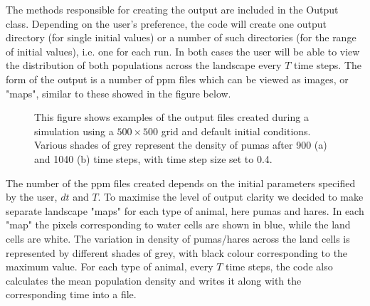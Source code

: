       The methods responsible for creating the output are included in the Output class. Depending on the user's preference, the code will create one output directory (for single initial values) or a number of such directories (for the range of initial values), i.e. one for each run. In both cases the user will be able to view the distribution of both populations across the landscape every $T$ time steps. The form of the output is a number of ppm files which can be viewed as images, or "maps", similar to these showed in the figure below.
     
      
      \begin{figure}[H]
      \begin{center}
      \caption{This figure shows examples of the output files created during a simulation using a $500 \times 500$ grid and default initial conditions. Various shades of grey represent the density of pumas after 900 (a) and 1040 (b) time steps, with time step size set to 0.4.}
      \end{center}
      \end{figure}
      
     
      The number of the ppm files created depends on the initial parameters specified by the user, $dt$ and $T$. To maximise the level of output clarity we decided to make separate landscape "maps" for each type of animal, here pumas and hares. In each "map" the pixels corresponding to water cells are shown in blue, while the land cells are white. The variation in density of pumas/hares across the land cells is represented by different shades of grey, with black colour corresponding to the maximum value. 
      \newline{}
      For each type of animal, every $T$ time steps, the code also calculates the mean population density and writes it along with the corresponding time into a file. 
